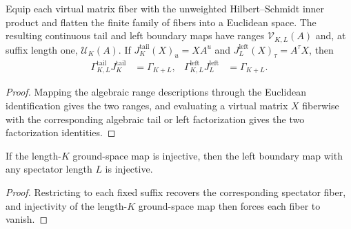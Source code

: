 \begin{lemma}%
    \label{thm:spectator_boundary_hilbert_factorization}
    \leanok
    Equip each virtual matrix fiber with the unweighted Hilbert--Schmidt inner
    product and flatten the finite family of fibers into a Euclidean space.
    The resulting continuous tail and left boundary maps have ranges
    $\mathcal V_{K,L}(A)$ and, at suffix length one, $\mathcal U_K(A)$.
    If $J^{\mathrm{tail}}_K(X)_u=XA^u$ and
    $J^{\mathrm{left}}_L(X)_\tau=A^\tau X$, then
    \begin{align}
        \Gamma^{\mathrm{tail}}_{K,L}J^{\mathrm{tail}}_K & =\Gamma_{K+L}, &
        \Gamma^{\mathrm{left}}_{K,L}J^{\mathrm{left}}_L & =\Gamma_{K+L}.
    \end{align}
\end{lemma}
\begin{proof}
    \leanok
    Mapping the algebraic range descriptions through the Euclidean
    identification gives the two ranges, and evaluating a virtual matrix \(X\)
    fiberwise with the corresponding algebraic tail or left factorization
    gives the two factorization identities.
\end{proof}

\begin{lemma}
    \label{thm:left_boundary_map_es_injective}
    \leanok
    If the length-$K$ ground-space map is injective, then the left boundary map
    with any spectator length $L$ is injective.
\end{lemma}

\begin{proof}
    \leanok
    Restricting to each fixed suffix recovers the corresponding spectator
    fiber, and injectivity of the length-$K$ ground-space map then forces each
    fiber to vanish.
\end{proof}

